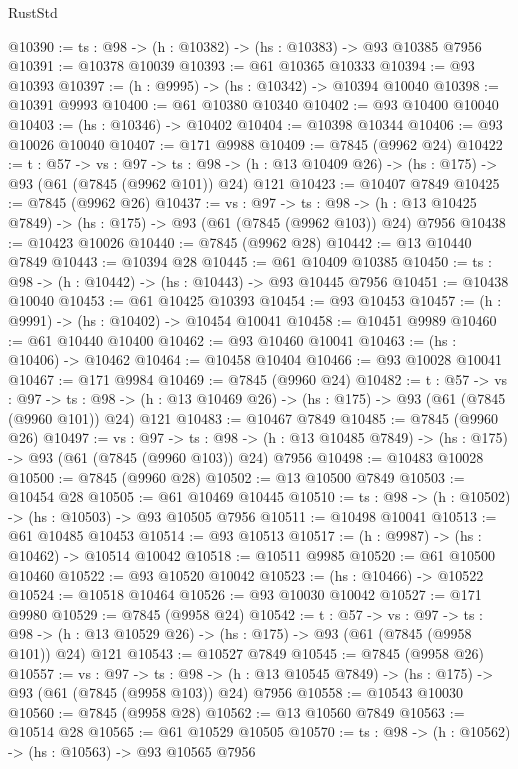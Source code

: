 \begin{lexlean}{RustStd}
\begin{coremodule}
@10390 := {ts : @98} -> (h : @10382) -> (hs : @10383) -> @93 @10385 @7956
@10391 := @10378 @10039
@10393 := @61 @10365 @10333
@10394 := @93 @10393
@10397 := (h : @9995) -> (hs : @10342) -> @10394 @10040
@10398 := @10391 @9993
@10400 := @61 @10380 @10340
@10402 := @93 @10400 @10040
@10403 := (hs : @10346) -> @10402
@10404 := @10398 @10344
@10406 := @93 @10026 @10040
@10407 := @171 @9988
@10409 := @7845 (@9962 @24)
@10422 := {t : @57} ->
  {vs : @97} ->
  {ts : @98} -> (h : @13 @10409 @26) -> (hs : @175) -> @93 (@61 (@7845 (@9962 @101)) @24) @121
@10423 := @10407 @7849
@10425 := @7845 (@9962 @26)
@10437 := {vs : @97} ->
  {ts : @98} -> (h : @13 @10425 @7849) -> (hs : @175) -> @93 (@61 (@7845 (@9962 @103)) @24) @7956
@10438 := @10423 @10026
@10440 := @7845 (@9962 @28)
@10442 := @13 @10440 @7849
@10443 := @10394 @28
@10445 := @61 @10409 @10385
@10450 := {ts : @98} -> (h : @10442) -> (hs : @10443) -> @93 @10445 @7956
@10451 := @10438 @10040
@10453 := @61 @10425 @10393
@10454 := @93 @10453
@10457 := (h : @9991) -> (hs : @10402) -> @10454 @10041
@10458 := @10451 @9989
@10460 := @61 @10440 @10400
@10462 := @93 @10460 @10041
@10463 := (hs : @10406) -> @10462
@10464 := @10458 @10404
@10466 := @93 @10028 @10041
@10467 := @171 @9984
@10469 := @7845 (@9960 @24)
@10482 := {t : @57} ->
  {vs : @97} ->
  {ts : @98} -> (h : @13 @10469 @26) -> (hs : @175) -> @93 (@61 (@7845 (@9960 @101)) @24) @121
@10483 := @10467 @7849
@10485 := @7845 (@9960 @26)
@10497 := {vs : @97} ->
  {ts : @98} -> (h : @13 @10485 @7849) -> (hs : @175) -> @93 (@61 (@7845 (@9960 @103)) @24) @7956
@10498 := @10483 @10028
@10500 := @7845 (@9960 @28)
@10502 := @13 @10500 @7849
@10503 := @10454 @28
@10505 := @61 @10469 @10445
@10510 := {ts : @98} -> (h : @10502) -> (hs : @10503) -> @93 @10505 @7956
@10511 := @10498 @10041
@10513 := @61 @10485 @10453
@10514 := @93 @10513
@10517 := (h : @9987) -> (hs : @10462) -> @10514 @10042
@10518 := @10511 @9985
@10520 := @61 @10500 @10460
@10522 := @93 @10520 @10042
@10523 := (hs : @10466) -> @10522
@10524 := @10518 @10464
@10526 := @93 @10030 @10042
@10527 := @171 @9980
@10529 := @7845 (@9958 @24)
@10542 := {t : @57} ->
  {vs : @97} ->
  {ts : @98} -> (h : @13 @10529 @26) -> (hs : @175) -> @93 (@61 (@7845 (@9958 @101)) @24) @121
@10543 := @10527 @7849
@10545 := @7845 (@9958 @26)
@10557 := {vs : @97} ->
  {ts : @98} -> (h : @13 @10545 @7849) -> (hs : @175) -> @93 (@61 (@7845 (@9958 @103)) @24) @7956
@10558 := @10543 @10030
@10560 := @7845 (@9958 @28)
@10562 := @13 @10560 @7849
@10563 := @10514 @28
@10565 := @61 @10529 @10505
@10570 := {ts : @98} -> (h : @10562) -> (hs : @10563) -> @93 @10565 @7956

\end{coremodule}
\end{lexlean}
